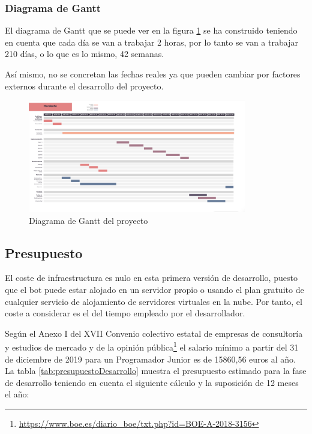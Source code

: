 \subsubsection{Diagrama de Gantt}

El diagrama de Gantt que se puede ver en la figura \ref{fig:gantt} se ha construido teniendo en cuenta que cada día se van a trabajar 2 horas, por lo tanto se van a trabajar 210 días, o lo que es lo mismo, 42 semanas.

Así mismo, no se concretan las fechas reales ya que pueden cambiar por factores externos durante el desarrollo del proyecto.

\begin{figure}[h]
\centering
\includegraphics[angle=90,origin=c,width=0.85\textwidth]{imagenes/gantt.png}
\caption{Diagrama de Gantt del proyecto}
\label{fig:gantt}
\end{figure}


\subsection{Presupuesto}

El coste de infraestructura es nulo en esta primera versión de desarrollo, puesto que el bot puede estar alojado en un servidor propio o usando el plan gratuito de cualquier servicio de alojamiento de servidores virtuales en la nube. Por tanto, el coste a considerar es el del tiempo empleado por el desarrollador.

Según el Anexo I del XVII Convenio colectivo estatal de empresas de consultoría y estudios de mercado y de la opinión pública\footnote{\url{https://www.boe.es/diario_boe/txt.php?id=BOE-A-2018-3156}} el salario mínimo a partir del 31 de diciembre de 2019 para un Programador Junior es de 15860,56 euros al año. La tabla \ref{tab:presupuestoDesarrollo} muestra el presupuesto estimado para la fase de desarrollo teniendo en cuenta el siguiente cálculo y la suposición de 12 meses el año:



